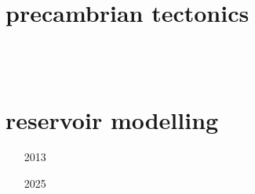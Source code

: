 \section{precambrian tectonics}

\begin{small}
\begin{itemize}
\item[\nineteenninetyfour] 
\item[\twothousandthree] 
\item[\twothousandten] 
\item[\twothousandeleven] 
\item[\twothousandfourteen] 
 \\
 \\
\item[\twothousandtwenty] 
\item[\twothousandtwentyfive] 
\end{itemize}
\end{small}

\section{reservoir modelling}

\begin{small}
\begin{itemize}
\item[2013] 
\item[2025] 
\end{itemize}
\end{small}


